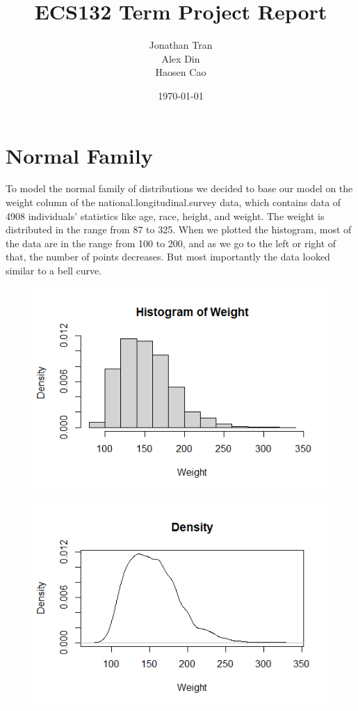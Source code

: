 \documentclass[12pt, a4paper, oneside]{report}
\title{ECS132 Term Project Report}
\author{Jonathan Tran\\Alex Din\\Haosen Cao}
\date{\today}
\begin{document}
\maketitle
\tableofcontents
\newpage









\section*{Normal Family}
To model the normal family of distributions we decided to base our model on the weight column of the national.longitudinal.survey data, which contains data of 4908 individuals' statistics like age, race, height, and weight. The weight is distributed in the range from 87 to 325. When we plotted the histogram, most of the data are in the range from 100 to 200, and as we go to the left or right of that, the number of points decreases. But most importantly the data looked similar to a bell curve.

\begin{figure}[h]
  \centering
  \includegraphics[width=0.7\linewidth]{normHist.png}
\end{figure}

\begin{figure}[h]
  \centering
  \includegraphics[width=0.7\linewidth]{normDensity.png}
\end{figure}
\end{document}
